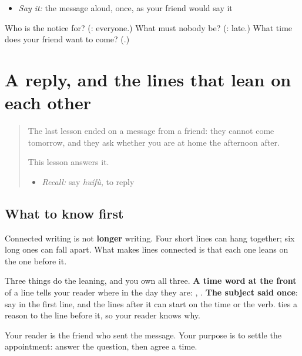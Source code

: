 \begin{itemize}
\raggedright
  \item \emph{Say it:} the message aloud, once, as your friend would say it
\end{itemize}

\begin{tcolorbox}[breakable,colback=teal!4,colframe=teal!35!black,title={Before you move on}]
Who is the notice for? (\textbf{}: everyone.) What must nobody be? (\textbf{}: late.) What time does your friend want to come? (\textbf{}.)
\end{tcolorbox}
\section[(a reply)]{A reply, and the lines that lean on each other}

\label{lesson:ZH-W157-reply}



\begin{quote}
The last lesson ended on a message from a friend: they cannot come tomorrow, and they ask whether you are at home the afternoon after.

This lesson answers it.

\begin{itemize}
\raggedright
  \item \emph{Recall:} say \emph{huífù}, to reply
\end{itemize}
\end{quote}

\subsection*{What to know first}
Connected writing is not \textbf{longer} writing. Four short lines can hang together; six long ones can fall apart. What makes lines connected is that each one leans on the one before it.

Three things do the leaning, and you own all three. \textbf{A time word at the front} of a line tells your reader where in the day they are: , . \textbf{The subject said once}: say  in the first line, and the lines after it can start on the time or the verb. \textbf{} ties a reason to the line before it, so your reader knows why.

Your reader is the friend who sent the message. Your purpose is to settle the appointment: answer the question, then agree a time.

